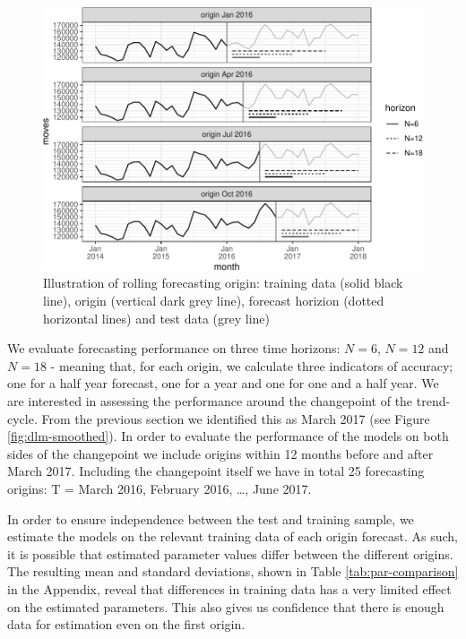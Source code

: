 \documentclass[]{article}
\begin{document}
\begin{figure}
\centering
\includegraphics{../figs/freq--rolling-forecast-example-1.pdf}
\caption{\label{fig:rolling-forecast-example}Illustration of rolling
forecasting origin: training data (solid black line), origin (vertical
dark grey line), forecast horizion (dotted horizontal lines) and test
data (grey line)}
\end{figure}

We evaluate forecasting performance on three time horizons: \(N=6\),
\(N=12\) and \(N=18\) - meaning that, for each origin, we calculate
three indicators of accuracy; one for a half year forecast, one for a
year and one for one and a half year. We are interested in assessing the
performance around the changepoint of the trend-cycle. From the previous
section we identified this as March 2017 (see Figure
\ref{fig:dlm-smoothed}). In order to evaluate the performance of the
models on both sides of the changepoint we include origins within 12
months before and after March 2017. Including the changepoint itself we
have in total 25 forecasting origins: T = March 2016, February 2016,
\ldots{}, June 2017.

In order to ensure independence between the test and training sample, we
estimate the models on the relevant training data of each origin
forecast. As such, it is possible that estimated parameter values differ
between the different origins. The resulting mean and standard
deviations, shown in Table \ref{tab:par-comparison} in the Appendix,
reveal that differences in training data has a very limited effect on
the estimated parameters. This also gives us confidence that there is
enough data for estimation even on the first origin.
\end{document}
